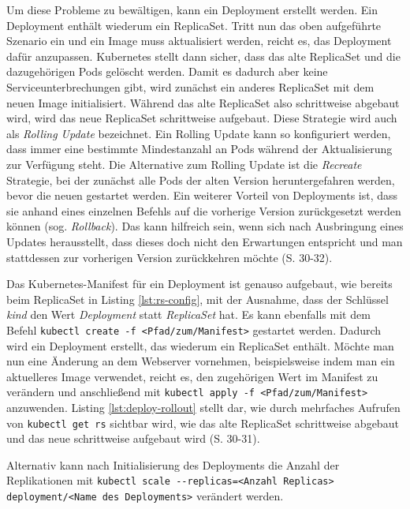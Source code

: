 \documentclass[11pt,a4paper]{article}
\begin{document}
Um diese Probleme zu bewältigen, kann ein Deployment erstellt werden.
Ein Deployment enthält wiederum ein ReplicaSet. Tritt nun das oben aufgeführte Szenario ein und ein Image
muss aktualisiert werden, reicht es, das Deployment dafür anzupassen.
Kubernetes stellt dann sicher, dass das alte ReplicaSet und die dazugehörigen Pods gelöscht werden.
Damit es dadurch aber keine Serviceunterbrechungen gibt, wird zunächst ein anderes ReplicaSet mit dem neuen
Image initialisiert. Während das alte ReplicaSet also schrittweise abgebaut wird, wird das neue ReplicaSet
schrittweise aufgebaut. Diese Strategie wird auch als \emph{Rolling Update} bezeichnet.
Ein Rolling Update kann so konfiguriert werden, dass immer eine bestimmte Mindestanzahl an
Pods während der Aktualisierung zur Verfügung steht.
Die Alternative zum Rolling Update ist die \emph{Recreate} Strategie, bei der zunächst
alle Pods der alten Version heruntergefahren werden, bevor die neuen gestartet werden.
Ein weiterer Vorteil von Deployments ist, dass sie anhand eines einzelnen Befehls auf die vorherige Version
zurückgesetzt werden können (sog. \emph{Rollback}). Das kann hilfreich sein, wenn sich nach Ausbringung eines
Updates herausstellt, dass dieses doch nicht den Erwartungen entspricht und man stattdessen zur vorherigen
Version zurückkehren möchte \cite{Schmeling_Dargatz_2022} (S. 30-32).

Das Kubernetes-Manifest für ein Deployment ist genauso aufgebaut, wie bereits beim ReplicaSet in
Listing \ref{lst:rs-config}, mit der Ausnahme, dass der Schlüssel \emph{kind} den Wert
\emph{Deployment} statt \emph{ReplicaSet} hat. Es kann ebenfalls mit dem Befehl
\lstinline|kubectl create -f <Pfad/zum/Manifest>| gestartet werden.
Dadurch wird ein Deployment erstellt, das wiederum ein ReplicaSet enthält.
Möchte man nun eine Änderung an dem Webserver vornehmen, beispielsweise indem
man ein aktuelleres Image verwendet, reicht es, den zugehörigen Wert im Manifest
zu verändern und anschließend mit \lstinline|kubectl apply -f <Pfad/zum/Manifest>| anzuwenden.
Listing \ref{lst:deploy-rollout} stellt dar, wie durch mehrfaches Aufrufen
von \lstinline|kubectl get rs| sichtbar wird, wie das alte
ReplicaSet schrittweise abgebaut und das neue schrittweise aufgebaut wird \cite{Schmeling_Dargatz_2022} (S. 30-31).

Alternativ kann nach Initialisierung des Deployments die Anzahl der Replikationen mit
\lstinline|kubectl scale --replicas=<Anzahl Replicas> deployment/<Name des Deployments>|
verändert werden.
\end{document}
